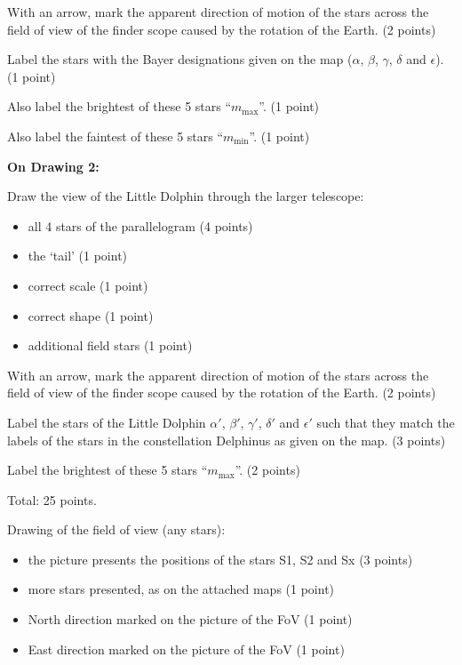 With an arrow, mark the apparent direction of motion of the stars across the
field of view of the finder scope caused by the rotation of the Earth.
\hfill(2 points)

Label the stars with the Bayer designations given on the map ($\alpha$,
$\beta$, $\gamma$, $\delta$ and $\epsilon$). \hfill(1 point)

Also label the brightest of these 5 stars ``$m_{\max}$''. \hfill(1 point)

Also label the faintest of these 5 stars ``$m_{\min}$''. \hfill(1 point)

\textbf{On Drawing 2:}

Draw the view of the Little Dolphin through the larger telescope:
\begin{itemize}
\item all 4 stars of the parallelogram \hfill(4 points)
\item the `tail' \hfill(1 point)
\item correct scale \hfill(1 point)
\item correct shape \hfill(1 point)
\item additional field stars \hfill(1 point)
\end{itemize}

With an arrow, mark the apparent direction of motion of the stars across the
field of view of the finder scope caused by the rotation of the Earth.
\hfill(2 points)

Label the stars of the Little Dolphin $\alpha'$, $\beta'$, $\gamma'$,
$\delta'$ and $\epsilon'$ such that they match the labels of the stars in
the constellation Delphinus as given on the map. \hfill(3 points)

Label the brightest of these 5 stars ``$m_{\max}$''. \hfill(2 points)

Total: 25 points.

Drawing of the field of view (any stars):
\begin{itemize}
\item the picture presents the positions of the stars S1, S2 and Sx
  \hfill(3 points)
\item more stars presented, as on the attached maps \hfill(1 point)
\item North direction marked on the picture of the FoV \hfill(1 point)
\item East direction marked on the picture of the FoV \hfill(1 point)
\end{itemize}

